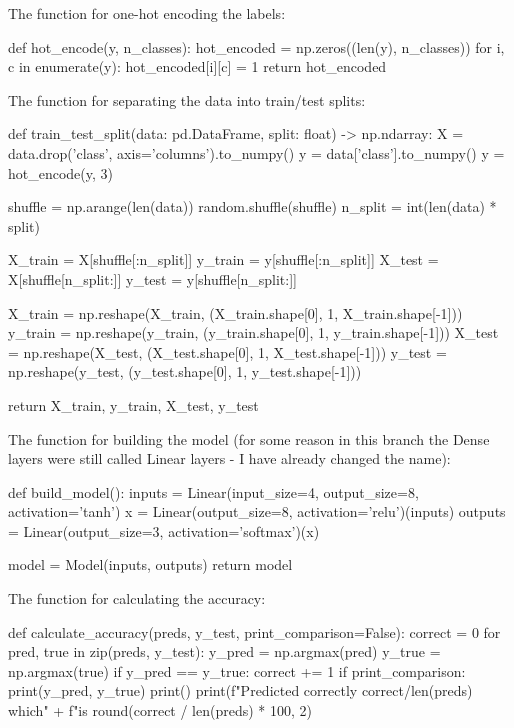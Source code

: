 \documentclass{article}
\begin{document}
The function for one-hot encoding the labels:
\begin{python}
def hot_encode(y, n_classes):
    hot_encoded = np.zeros((len(y), n_classes))
    for i, c in enumerate(y):
        hot_encoded[i][c] = 1
    return hot_encoded
\end{python}

The function for separating the data into train/test splits:
\begin{python}   
def train_test_split(data: pd.DataFrame, split: float) -> np.ndarray:
    X = data.drop('class', axis='columns').to_numpy()
    y = data['class'].to_numpy()
    y = hot_encode(y, 3)

    shuffle = np.arange(len(data))
    random.shuffle(shuffle)
    n_split = int(len(data) * split)

    X_train = X[shuffle[:n_split]]
    y_train = y[shuffle[:n_split]]
    X_test = X[shuffle[n_split:]]
    y_test = y[shuffle[n_split:]]

    X_train = np.reshape(X_train, (X_train.shape[0], 1, X_train.shape[-1]))
    y_train = np.reshape(y_train, (y_train.shape[0], 1, y_train.shape[-1]))
    X_test = np.reshape(X_test, (X_test.shape[0], 1, X_test.shape[-1]))
    y_test = np.reshape(y_test, (y_test.shape[0], 1, y_test.shape[-1]))

    return X_train, y_train, X_test, y_test
\end{python}

The function for building the model (for some reason in this branch the Dense layers were still called Linear layers - I have already changed the name):
\begin{python}
def build_model():
    inputs = Linear(input_size=4, output_size=8, activation='tanh')
    x = Linear(output_size=8, activation='relu')(inputs)
    outputs = Linear(output_size=3, activation='softmax')(x)

    model = Model(inputs, outputs)
    return model
\end{python}

The function for calculating the accuracy:
\begin{python}
def calculate_accuracy(preds, y_test, print_comparison=False):
    correct = 0
    for pred, true in zip(preds, y_test):
        y_pred = np.argmax(pred)
        y_true = np.argmax(true)
        if y_pred == y_true:
            correct += 1
        if print_comparison:
            print(y_pred, y_true)
    print()
    print(f"Predicted correctly {correct}/{len(preds)} which" +
          f"is {round(correct / len(preds) * 100, 2)}%
\end{python}
\end{document}
